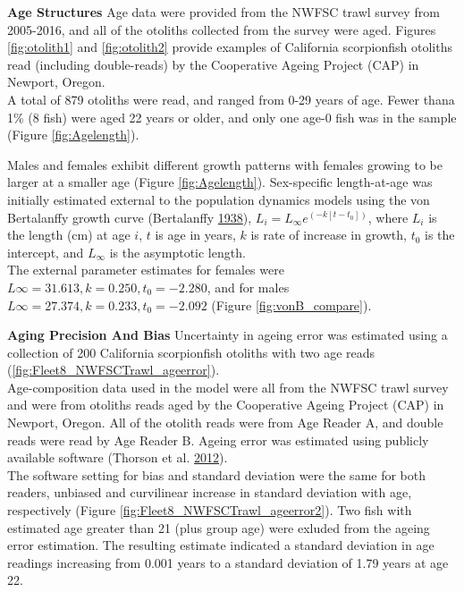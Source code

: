\documentclass[12pt,]{article}
\begin{document}
\vspace{.5cm}

\textbf{Age Structures} Age data were provided from the NWFSC trawl
survey from 2005-2016, and all of the otoliths collected from the survey
were aged. Figures \ref{fig:otolith1} and \ref{fig:otolith2} provide
examples of California scorpionfish otoliths read (including
double-reads) by the Cooperative Ageing Project (CAP) in Newport,
Oregon.\\
A total of 879 otoliths were read, and ranged from 0-29 years of age.
Fewer thana 1\% (8 fish) were aged 22 years or older, and only one age-0
fish was in the sample (Figure \ref{fig:Agelength}).

Males and females exhibit different growth patterns with females growing
to be larger at a smaller age (Figure \ref{fig:Agelength}). Sex-specific
length-at-age was initially estimated external to the population
dynamics models using the von Bertalanffy growth curve (Bertalanffy
\protect\hyperlink{ref-vonB1938}{1938}),
\(L_i = L_{\infty}e^{(-k[t-t_0])}\), where \(L_i\) is the length (cm) at
age \(i\), \(t\) is age in years, \(k\) is rate of increase in growth,
\(t_0\) is the intercept, and \(L_{\infty}\) is the asymptotic length.\\
The external parameter estimates for females were
\(L{\infty}=31.613, k = 0.250, t_0 = -2.280\), and for males
\(L{\infty}=27.374, k = 0.233, t_0 = -2.092\) (Figure
\ref{fig:vonB_compare}).

\vspace{.5cm}

\textbf{Aging Precision And Bias} Uncertainty in ageing error was
estimated using a collection of 200 California scorpionfish otoliths
with two age reads (\ref{fig:Fleet8_NWFSCTrawl_ageerror}).\\
Age-composition data used in the model were all from the NWFSC trawl
survey and were from otoliths reads aged by the Cooperative Ageing
Project (CAP) in Newport, Oregon. All of the otolith reads were from Age
Reader A, and double reads were read by Age Reader B. Ageing error was
estimated using publicly available software (Thorson et al.
\protect\hyperlink{ref-Thorson2012}{2012}).\\
The software setting for bias and standard deviation were the same for
both readers, unbiased and curvilinear increase in standard deviation
with age, respectively (Figure \ref{fig:Fleet8_NWFSCTrawl_ageerror2}).
Two fish with estimated age greater than 21 (plus group age) were
exluded from the ageing error estimation. The resulting estimate
indicated a standard deviation in age readings increasing from 0.001
years to a standard deviation of 1.79 years at age 22.
\end{document}
